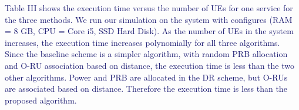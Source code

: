 \documentclass[lettersize,journal]{IEEEtran}
\begin{document}
\textcolor{MidnightBlue}{Table III shows the execution time versus the number of UEs for one service for the three methods. We run our simulation on the system with configures (RAM = 8 GB, CPU = Core i5, SSD Hard Disk). 
 As the number of UEs in the system increases, the execution time increases polynomially for all three algorithms.
Since the baseline scheme is a simpler algorithm, with random PRB allocation and O-RU association based on distance, the execution time is less than the two other algorithms. Power and PRB are allocated in the DR scheme, but O-RUs are associated based on distance. Therefore the execution time is less than the proposed algorithm.}
\begin{table}%
 \caption {Execution Time vs. Number of UEs} 
\begin{center}
\vspace*{-1.6em}
\end{center}
\end{table}
\vspace*{-1.4em}
\end{document}
